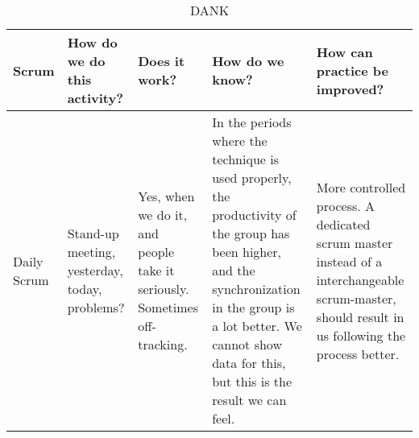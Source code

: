 \begin{sidewaystable}[]
\centering
\caption{DANK}
\label{my-label}
\begin{tabularx}{\textwidth}{|l|X|X|X|X|}
\hline
Scrum
& How do we do this activity?                                                                                                                                                                             & Does it work?                                                                                                                                                                                                                                                                              & How do we know?                                                                                                                                                                                                                                                                                                                                                                                                                                         & How can practice be improved?                                                                                                                                                                                                                                                                \\ \hline
Daily Scrum                 
& Stand-up meeting, yesterday, today, problems?                                                                                                                                                           
& Yes, when we do it, and people take it seriously. Sometimes off-tracking.                                                                                                                                                                                                                   
& In the periods where the technique is used properly, the productivity of the group has been higher, and the synchronization in the group is a lot better. We cannot show data for this, but this is the result we can feel.                                                                                                                                                                                                                             & More controlled process. A dedicated scrum master instead of a interchangeable scrum-master, should result in us following the process better.                                                                                                                                                \\ \hline

\end{tabularx}
\end{sidewaystable}
